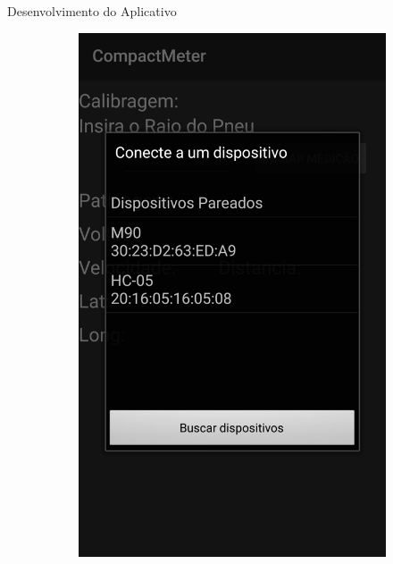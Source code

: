 \documentclass[12pt]{beamer}
\begin{document}
\begin{frame}{Desenvolvimento do Aplicativo}
\begin{figure}
\begin{subfigure}[t]{0.3\textwidth}
        \includegraphics[width=\textwidth]{DeviceList.png}
        \label{fig:DeviceList}
        \end{subfigure}
        ~
        \begin{subfigure}[t]{0.3\textwidth}

\end{subfigure}
\end{figure}
\end{frame}
\end{document}
